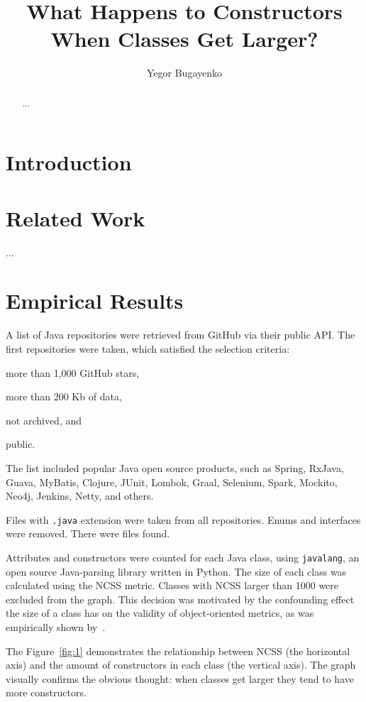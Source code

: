\documentclass[12pt]{article}
\title{What Happens to Constructors When Classes Get Larger?}
\author{Yegor Bugayenko}{}{}
\begin{document}
\raggedbottom
\maketitle

\begin{abstract}
...
\end{abstract}

\section{Introduction}


\section{Related Work}

...

\section{Empirical Results}

A list of Java repositories were retrieved from GitHub via their
public API. The first \thetotalrepos{} repositories were taken, which satisfied
the selection criteria:
\begin{enumerate*}[label={\arabic*)}]
\item more than 1,000 GitHub stars,
\item more than 200 Kb of data,
\item not archived, and
\item public.
\end{enumerate*}
The list included popular Java open source products, such as
Spring, RxJava, Guava, MyBatis, Clojure, JUnit, Lombok,
Graal, Selenium, Spark, Mockito, Neo4j, Jenkins, Netty, and others.

Files with \texttt{.java} extension were taken from all repositories.
Enums and interfaces were removed.
There were \thetotaljavafiles{} files found.

Attributes and constructors were counted for each Java class,
using \texttt{javalang}, an open source Java-parsing library written in Python.
The size of each class was calculated using the NCSS metric.
Classes with NCSS larger than 1000 were excluded from the graph. This decision was
motivated by the confounding effect the size of a class has
on the validity of object-oriented metrics, as was empirically shown by~\citet{el2001}.

The Figure~\ref{fig:1} demonstrates the relationship between NCSS (the horizontal
axis) and the amount of constructors in each class (the vertical axis). The
graph visually confirms the obvious thought: when classes get larger
they tend to have more constructors.
\end{document}
